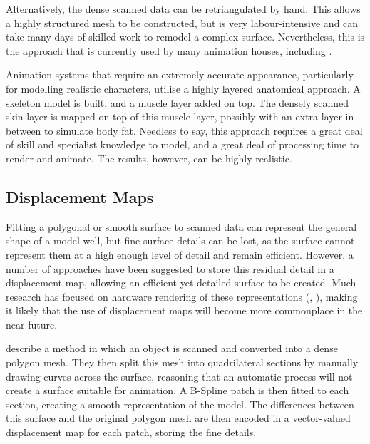 Alternatively, the dense scanned data can be retriangulated by hand. This allows a highly structured mesh to be constructed, but is very labour-intensive and can take many days of skilled work to remodel a complex surface. Nevertheless, this is the approach that is currently used by many animation houses, including \citet{Hensons}.

Animation systems that require an extremely accurate appearance, particularly for modelling realistic characters, utilise a highly layered anatomical approach. A skeleton model is built, and a muscle layer added on top. The densely scanned skin layer is mapped on top of this muscle layer, possibly with an extra layer in between to simulate body fat. Needless to say, this approach requires a great deal of skill and specialist knowledge to model, and a great deal of processing time to render and animate. The results, however, can be highly realistic.

\subsection{\label{sec:litreview:modeling:detail}Displacement Maps}

Fitting a polygonal or smooth surface to scanned data can represent the general shape of a model well, but fine surface details can be lost, as the surface cannot represent them at a high enough level of detail and remain efficient. However, a number of approaches have been suggested to store this residual detail in a displacement map, allowing an efficient yet detailed surface to be created. Much research has focused on hardware rendering of these representations (\cite{Gumhold99a}, \cite{Doggett00}), making it likely that the use of displacement maps will become more commonplace in the near future.

\citet{Krishnamurthy96} describe a method in which an object is scanned and converted into a dense polygon mesh. They then split this mesh into quadrilateral sections by manually drawing curves across the surface, reasoning that an automatic process will not create a surface suitable for animation. A B-Spline patch is then fitted to each section, creating a smooth representation of the model. The differences between this surface and the original polygon mesh are then encoded in a vector-valued displacement map for each patch, storing the fine details.

